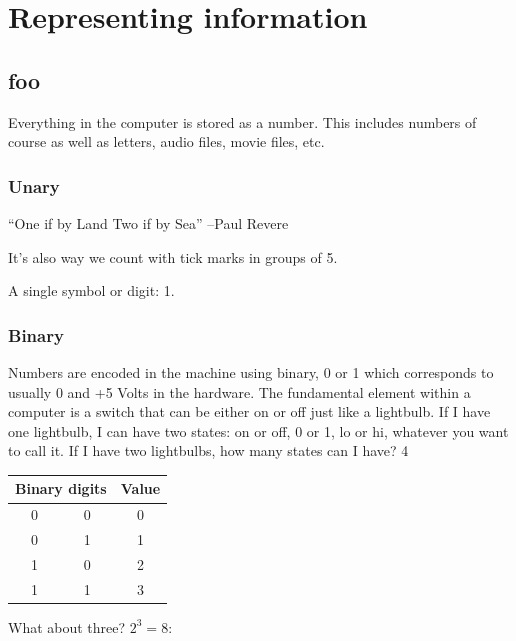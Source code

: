 \chapter{Representing information}

\setcounter{problem}{1}

\section{foo}

\begin{fullwidth}

Everything in the computer is stored as a number. This includes numbers of course as well as letters, audio files, movie files, etc.

\subsection{Unary}

``One if by Land Two if by Sea'' --Paul Revere

It's also way we count with tick marks in groups of 5.

A single symbol or digit: 1.

\subsection{Binary}

Numbers are encoded in the machine using binary, 0 or 1 which corresponds to usually 0 and +5 Volts in the hardware. The fundamental element within a computer is a switch that can be either on or off just like a lightbulb. If I have one lightbulb, I can have two states: on or off, 0 or 1, lo or hi, whatever you want to call it. If I have two lightbulbs, how many states can I have? 4

\begin{center}
\begin{tabular}{|cc|c|}
\hline
\multicolumn{2}{|c|}{Binary digits} & Value\\
\hline
0 & 0 & 0\\
0 & 1 & 1\\
1 & 0 & 2\\
1 & 1 & 3\\
\hline
\end{tabular}
\end{center}

What about three? $2^3 = 8$:


\end{fullwidth}
